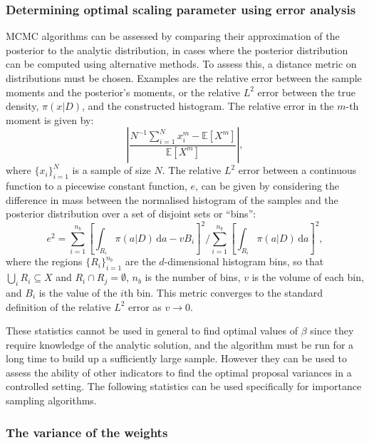 \documentclass[final]{siamltex}
\begin{document}
\subsubsection{Determining optimal scaling parameter using error analysis}

MCMC algorithms can be assessed by comparing their approximation of
the posterior to the analytic distribution, in cases where the
posterior distribution can be computed using alternative methods. To
assess this, a distance metric on distributions must be chosen. Examples are the
relative error between the sample moments and the posterior's moments, or the
relative $L^2$ error between the true density, $\pi(x|D)$, and the
constructed histogram. The relative error in the $m$-th moment is
given by:
\[
	\left|\frac{N^{-1}\sum_{i=1}^N \! x_i^m - \mathbb{E}[X^m]}{\mathbb{E}[X^m]}\right|,
\]
where $\{x_i\}_{i=1}^N$ is a sample of size $N$. The relative $L^2$
error between a continuous function to a piecewise constant function,
$e$, can be given by considering the difference in mass between the
normalised histogram of the samples and the posterior distribution
over a set of disjoint sets or ``bins'':
\begin{equation}\label{eqn:L2_error}
	e^2 = \sum\limits_{i=1}^{n_b}\left[\displaystyle\int_{R_i} \! \pi(a|D) \, \mbox{d}a - vB_i\right]^2 \Big/ \sum\limits_{i=1}^{n_b}\left[\displaystyle\int_{R_i} \! \pi(a|D) \, \mbox{d}a\right]^2,
\end{equation}
where the regions $\{R_i\}_{i=1}^{n_b}$ are the $d$-dimensional
histogram bins, so that $\bigcup_i R_i \subseteq X$ and
$R_i\cap R_j=\emptyset$, $n_b$ is the number of bins, $v$ is the
volume of each bin, and $B_i$ is the value of the $i$th bin. This
metric converges to the standard definition of the relative $L^2$
error as $v\rightarrow 0$.

These statistics cannot be used in general to find optimal values of
$\beta$ since they require knowledge of the analytic solution, and
the algorithm must be run for a long time to build up a
sufficiently large sample. However they can be used to assess the
ability of other indicators to find the optimal proposal
variances in a controlled setting. The following statistics can be used specifically for importance sampling algorithms.

\subsubsection{The variance of the weights}
\end{document}
